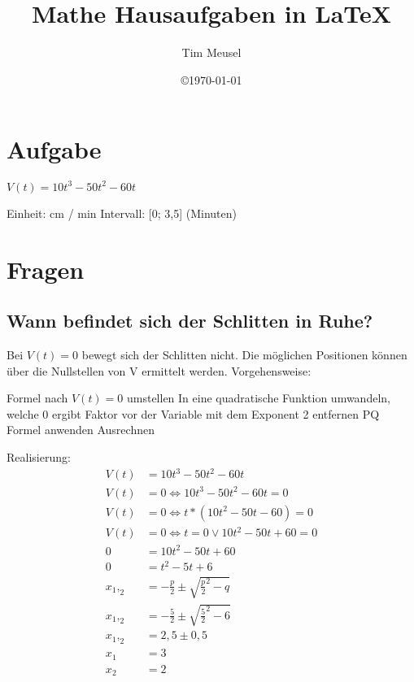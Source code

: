 \documentclass[a4paper,11pt]{scrartcl}
\author{Tim Meusel}
\title{Mathe Hausaufgaben in \LaTeX{}}
\date{\copyright\today}
\begin{document}
\maketitle

\section{Aufgabe}

$V(t) = 10t^3 - 50t^2 - 60t$


Einheit: cm / min
Intervall: [0; 3,5] (Minuten)

\section{Fragen}

\subsection{Wann befindet sich der Schlitten in Ruhe?}
Bei $V(t) = 0$ bewegt sich der Schlitten nicht. Die möglichen Positionen können
über die Nullstellen von V ermittelt werden. Vorgehensweise:

\begin{outline}
  \1 Formel nach $V(t) = 0$ umstellen
  \1 In eine quadratische Funktion umwandeln, welche 0 ergibt
  \1 Faktor vor der Variable mit dem Exponent 2 entfernen
  \1 PQ Formel anwenden
  \1 Ausrechnen
\end{outline}

Realisierung:
\begin{align*}
  V(t) &= 10t^3 - 50t^2 - 60t                               \\
  V(t) &= 0 \Leftrightarrow 10t^3 - 50t^2 - 60t = 0         \\
  V(t) &= 0 \Leftrightarrow t * (10t^2 - 50t - 60) = 0      \\
  V(t) &= 0 \Leftrightarrow t = 0 \vee 10t^2 - 50t + 60 = 0 \\
     0 &= 10t^2 - 50t + 60                                  \\
     0 &= t^2 - 5t + 6                                      \\
 x_1,_2 &= -\frac{p}{2} \pm \sqrt{\frac{p}{2}^2 - q}        \\
 x_1,_2 &= -\frac{5}{2} \pm \sqrt{\frac{5}{2}^2 - 6}        \\
 x_1,_2 &= 2,5 \pm 0,5                                      \\
 x_1    &= 3                                                \\
 x_2    &= 2                                                \\
\end{align*}
\end{document}
